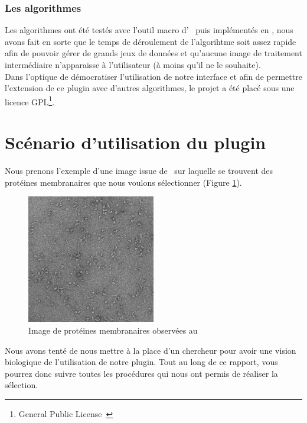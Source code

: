 \subsubsection{Les algorithmes}

\noindent
Les algorithmes ont été testés avec l'outil macro d' \imj ~puis implémentés en \java, nous avons fait en sorte que le temps de déroulement de l'algorihtme soit assez rapide afin de pouvoir gérer de grands jeux de données et qu'aucune image de traitement intermédiaire n'apparaisse à l'utilisateur (à moins qu'il ne le souhaite).\\

Dans l'optique de démocratiser l'utilisation de notre interface et afin de permettre l'extension de ce plugin avec d'autres algorithmes, le projet a été placé sous une licence GPL\footnote{General Public License~\cite{GPL:url}}.

\noindent

\section{Scénario d'utilisation du plugin}

Nous prenons l'exemple d'une image issue de \cme ~sur laquelle se trouvent des protéines membranaires que nous voulons sélectionner (Figure \ref{prot}).

\begin{figure}[h] 
\begin{center}
\includegraphics[width=0.5\textwidth]{proteines.jpg}
\caption{Image de protéines membranaires observées au \cme}
\label{prot}
\end{center}
\end{figure}

Nous avons tenté de nous mettre à la place d'un chercheur pour avoir une vision biologique de l'utilisation de notre plugin. Tout au long de ce rapport, vous pourrez donc suivre toutes les procédures qui nous ont permis de réaliser la sélection. 













